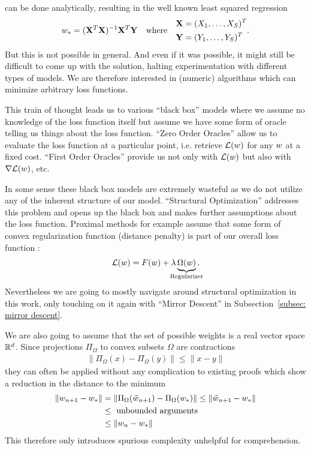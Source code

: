 can be done analytically, resulting in the well known least squared
regression
\begin{align*}
	w_* = (\mathbf{X}^T\mathbf{X})^{-1}\mathbf{X}^T\mathbf{Y} \quad \text{where}\quad 
	\begin{aligned}
		\mathbf{X}&=(X_1,\dots,X_S)^T\\
		\mathbf{Y}&=(Y_1,\dots,Y_S)^T
	\end{aligned}.
\end{align*}
But this is not possible in general. And even if it was possible, it might still
be difficult to come up with the solution, halting experimentation
with different types of models. We are therefore interested in (numeric)
algorithms which can minimize arbitrary loss functions.

This train of thought leads us to various ``black box'' models where we assume
no knowledge of the loss function itself but assume we have some form of oracle
telling us things about the loss function. ``Zero Order Oracles'' allow us to
evaluate the loss function at a particular point, i.e. retrieve \(\mathcal{L}(w)\)
for any \(w\) at a fixed cost. ``First Order Oracles'' provide us not
only with \(\mathcal{L}(w)\) but also with \(\nabla\mathcal{L}(w)\), etc.

In some sense these black box models are extremely wasteful as we do not utilize
any of the inherent structure of our model. ``Structural Optimization'' addresses
this problem and opens up the black box and makes further assumptions about
the loss function. Proximal methods for example assume that some form of convex
regularization function (distance penalty) is part of our overall loss
function \parencite[see e.g.][]{bottouOptimizationMethodsLargeScale2018}:
\begin{align*}
	\Loss(\weights)
	= F(\weights) + \lambda \underbrace{\Omega(\weights)}_{\mathclap{\text{Regularizer}}}.
\end{align*}
Nevertheless we are going to mostly navigate around structural optimization in
this work, only touching on it again with ``Mirror Descent'' in
Subsection~\ref{subsec: mirror descent}.

We are also going to assume that the set of possible weights is a real
vector space \(\mathbb{R}^d\). Since projections \(\Pi_\Omega\) to convex
subsets \(\Omega\) are contractions \parencite[Lemma
3.1]{bubeckConvexOptimizationAlgorithms2015}
\begin{align*}
	\| \Pi_\Omega(x) - \Pi_\Omega(y) \| \le \| x - y \|
\end{align*}
they can often be applied without any complication to existing proofs which show
a reduction in the distance to the minimum
\begin{align*}
	\|w_{n+1} - w_* \|
	&= \|\Pi_\Omega(\tilde{w}_{n+1}) - \Pi_\Omega(w_*)\|
	\le \|\tilde{w}_{n+1} - w_* \|\\
	&\le \text{ unbounded arguments }\\
	&\le \|w_n - w_*\|
\end{align*}
This therefore only introduces spurious complexity unhelpful for comprehension.

